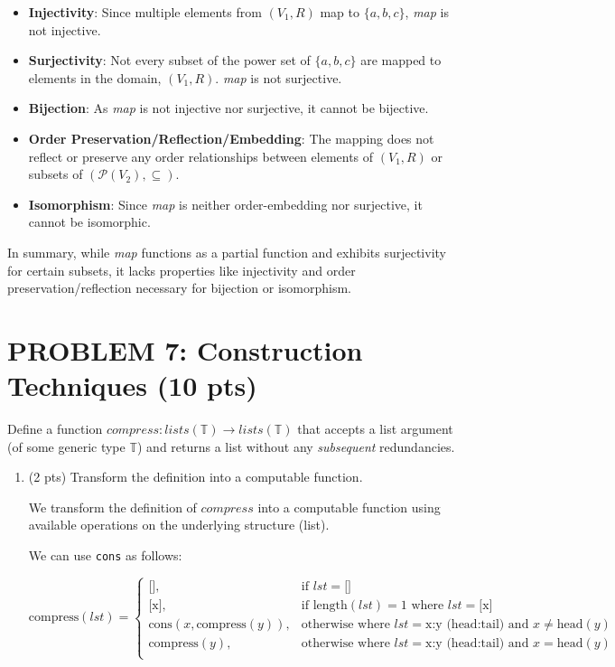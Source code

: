 \documentclass[12pt]{article}
\begin{document}
\begin{spacing}{1.5}
\begin{itemize}
		\item \textbf{Injectivity}: Since multiple elements from $(V_1, R)$ map to $\{a,b,c\}$, \textit{map} is not injective.
		      		      
		\item \textbf{Surjectivity}: Not every subset of the power set of $\{a,b,c\}$ are mapped to elements in the domain, $(V_1,R)$. \textit{map} is not surjective.
		      		      
		\item \textbf{Bijection}: As \textit{map} is not injective nor surjective, it cannot be bijective.
		      		      
		\item \textbf{Order Preservation/Reflection/Embedding}: The mapping does not reflect or preserve any order relationships between elements of $(V_1, R)$ or subsets of $(\mathcal{P}(V_2), \subseteq)$.
		      		      
		\item \textbf{Isomorphism}: Since \textit{map} is neither order-embedding nor surjective, it cannot be isomorphic.
	\end{itemize}
		
	\noindent In summary, while \textit{map} functions as a partial function and exhibits surjectivity for certain subsets, it lacks properties like injectivity and order preservation/reflection necessary for bijection or isomorphism.
			    
	\newpage
	\section*{PROBLEM 7: Construction Techniques (10 pts)}
		
	Define a function $compress : lists(\mathbb{T}) \rightarrow lists(\mathbb{T})$ that accepts a list argument (of some generic type $\mathbb{T}$) and returns a list without any \textit{subsequent} redundancies.
		
	\begin{enumerate}
		\item (2 pts) Transform the definition into a computable function.
		      		      
		      We transform the definition of $compress$ into a computable function using available operations on the underlying structure (list).
		      
		      We can use \texttt{cons} as follows:
		      
		      $$\text{compress}(lst) =\begin{cases}\text{[]}, & \text{if } lst = \text{[]} \\\text{[x]}, & \text{if } \text{length}(lst) = 1 \text{ where } lst = \text{[x]} \\\text{cons}(x, \text{compress}(y)), & \text{otherwise where } lst = \text{x:y} \text{ (head:tail) and } x \neq \text{head}(y) \\\text{compress}(y), & \text{otherwise where } lst = \text{x:y} \text{ (head:tail) and } x = \text{head}(y) \\\end{cases}$$
		      		

\end{enumerate}
\end{spacing}
\end{document}
